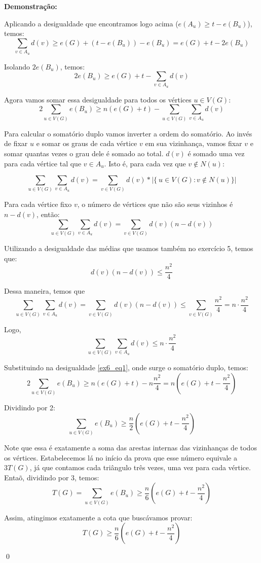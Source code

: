 \documentclass[12pt]{article}
\newenvironment{sol}
    {\textbf{Demonstração:}\emph{}
    }
    {
    \qed
    }
\begin{document}
\begin{sol}
    Aplicando a desigualdade que encontramos logo acima ($e(A_u) \geq t - e(B_u)$), temos:
    $$\sum_{v\in A_u} d(v) \geq e(G) + (t-e(B_u)) - e(B_u) = e(G) + t - 2e(B_u)$$

    Isolando $2e(B_u)$, temos:
    $$2e(B_u) \geq e(G) + t - \sum_{v\in A_u} d(v)$$

    Agora vamos somar essa desigualdade para todos os vértices $u\in V(G)$:
    \begin{equation}
        \label{ex6_eq1}
        2\sum_{u\in V(G)} e(B_u) \geq n(e(G)+t) - \sum_{u\in V(G)} \sum_{v\in A_u} d(v)
    \end{equation}


    Para calcular o somatório duplo vamos inverter a ordem do somatório.
    Ao invés de fixar $u$ e somar os graus de cada vértice $v$ em sua vizinhança,
    vamos fixar $v$ e somar quantas vezes o grau dele é somado ao total. $d(v)$ é
    somado uma vez para cada vértice tal que $v\in A_u$. Isto é, para cada vez que $v\notin N(u)$:

    $$\sum_{u\in V(G)} \sum_{v\in A_u} d(v) = \sum_{v\in V(G)} d(v)*|\{\ u\in V(G) : v\notin N(u) \}|$$

    Para cada vértice fixo $v$, o número de vértices que não são seus vizinhos é $n-d(v)$, então:
    $$\sum_{u\in V(G)} \sum_{v\in A_u} d(v) = \sum_{v\in V(G)} d(v)(n-d(v))$$

    Utilizando a desigualdade das médias que usamos também no exercício 5, temos que:
    $$d(v)(n-d(v)) \leq \frac{n^2}{4}$$

    Dessa maneira, temos que
    $$\sum_{u\in V(G)}\sum_{v\in A_u} d(v)=\sum_{v\in V(G)} d(v)(n-d(v)) \leq \sum_{v\in V(G)} \frac{n^2}{4} = n\cdot\frac{n^2}{4}$$

    Logo,
    $$\sum_{u\in V(G)}\sum_{v\in A_u} d(v) \leq n\cdot\frac{n^2}{4}$$

    Substituindo na desigualdade \ref{ex6_eq1}, onde surge o somatório duplo, temos:
    $$2 \sum_{u \in V(G)} e(B_u) \ge n(e(G) + t) - n\frac{n^2}{4} = n\left(e(G) + t - \frac{n^2}{4}\right)$$

    Dividindo por 2:
    $$\sum_{u \in V(G)} e(B_u) \ge \frac{n}{2}\left(e(G) + t - \frac{n^2}{4}\right)$$

    Note que essa é exatamente a soma das arestas internas das vizinhanças de todos os vértices.
    Estabelecemos lá no início da prova que esse número equivale a $3T(G)$, já que contamos cada
    triângulo três vezes, uma vez para cada vértice. Entaõ, dividindo por 3, temos:
    $$T(G) = \sum_{u \in V(G)}e(B_u) \ge \frac{n}{6}\left(e(G) + t - \frac{n^2}{4}\right)$$
    
    Assim, atingimos exatamente a cota que buscávamos provar:
    $$T(G) \ge \frac{n}{6}\left(e(G) + t - \frac{n^2}{4}\right)$$

\end{sol}
\end{document}
